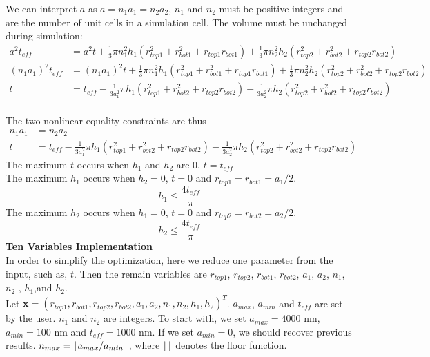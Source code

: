 \documentclass[12pt]{article}
\numberwithin{equation}{section}
\DeclarePairedDelimiter\floor{\lfloor}{\rfloor}
\numberwithin{equation}{section}
\begin{document}
\begin{outline}[enumerate]
\begin{equation}
\end{equation}
We can interpret $a$ as $a = n_1 a_1 = n_2 a_2$, $n_1$ and $n_2$ must be positive integers and are the number of unit cells in a simulation cell.  
The volume must be unchanged during simulation:
\begin{align*}
a^2 t_{eff} &= a^2 t + \frac{1}{3}\pi n_1^2 h_1(r_{top1}^2+r_{bot1}^2+r_{top1}r_{bot1})+\frac{1}{3}\pi n_2^2 h_2(r_{top2}^2+r_{bot2}^2+r_{top2}r_{bot2})\nonumber \\
(n_1a_1)^2t_{eff} &=(n_1a_1)^2t + \frac{1}{3}\pi n_1^2 h_1(r_{top1}^2+r_{bot1}^2+r_{top1}r_{bot1})+\frac{1}{3}\pi n_2^2 h_2(r_{top2}^2+r_{bot2}^2+r_{top2}r_{bot2})\nonumber \\
 t &= t_{eff} - \frac{1}{3a_1^2}\pi h_1(r_{top1}^2+r_{bot2}^2+r_{top2}r_{bot2}) - \frac{1}{3a_2^2}\pi h_2(r_{top2}^2+r_{bot2}^2+r_{top2}r_{bot2})
 \end{align*}  \\
The two nonlinear equality constraints are thus
\begin{align}
n_1 a_1 &= n_2 a_2\\
 t &= t_{eff} - \frac{1}{3a_1^2}\pi h_1(r_{top1}^2+r_{bot2}^2+r_{top2}r_{bot2}) - \frac{1}{3a_2^2}\pi h_2(r_{top2}^2+r_{bot2}^2+r_{top2}r_{bot2})
\end{align}
The maximum $t$ occurs when $h_{1}$ and $h_{2}$ are 0. $t=t_{eff}$ \\
The maximum $h_1$ occurs when $h_{2}=0$, $t = 0$ and $r_{top1} = r_{bot1} = a_1/2$.  
\begin{equation*}
h_{1} \leq \frac{4 t_{eff}}{\pi} 
\end{equation*}
The maximum $h_2$ occurs when $h_{1}=0$, $t = 0$ and $r_{top2} = r_{bot2} = a_2/2$.  
\begin{equation*}
h_{2} \leq \frac{4 t_{eff}}{\pi} 
\end{equation*}
\1 \textbf{Ten Variables Implementation} \\
In order to simplify the optimization, here we reduce one parameter from the input, such as, $t$.   
Then the remain variables are $r_{top1}$, $r_{top2}$, $r_{bot1}$, $r_{bot2}$, $a_1$, $a_2$, $n_1$, $n_2$ , $h_1$,and $h_2$. \\
Let $\mathbf{x} = \left ( r_{top1}, r_{bot1}, r_{top2}, r_{bot2}, a_1, a_2, n_1, n_2, h_1, h_2  \right )^T $.
$a_{max}$, $a_{min}$ and $t_{eff}$ are set by the user.  $n_{1}$ and $n_{2}$ are integers. To start with, we set $a_{max} = 4000$ nm,$a_{min} = 100$ nm and $t_{eff} = 1000$ nm.  If we set $a_{min} = 0$, we should recover previous results. $n_{max} = \floor{a_{max}/a_{min}}$, where $\floor{ }$ denotes the floor function.


\end{outline}
\end{document}
